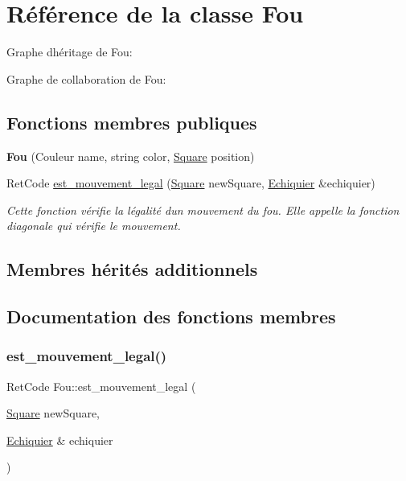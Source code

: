 \hypertarget{classFou}{}\section{Référence de la classe Fou}
\label{classFou}


Graphe d\textquotesingle{}héritage de Fou\+:


Graphe de collaboration de Fou\+:
\subsection*{Fonctions membres publiques}
\begin{DoxyCompactItemize}
\item 
\mbox{\label{classFou_a7c193c5725a7c543e6ee8fb78257370b}} 
{\bfseries Fou} (Couleur name, string color, \hyperlink{classSquare}{Square} position)
\item 
Ret\+Code \hyperlink{classFou_a5b1e65e01d3172846e0e28e8ac50c03d}{est\+\_\+mouvement\+\_\+legal} (\hyperlink{classSquare}{Square} new\+Square, \hyperlink{classEchiquier}{Echiquier} \&echiquier)
\begin{DoxyCompactList}\small\item\em Cette fonction vérifie la légalité d\textquotesingle{}un mouvement du fou. Elle appelle la fonction diagonale qui vérifie le mouvement. \end{DoxyCompactList}\end{DoxyCompactItemize}
\subsection*{Membres hérités additionnels}


\subsection{Documentation des fonctions membres}
\mbox{\label{classFou_a5b1e65e01d3172846e0e28e8ac50c03d}} 
\subsubsection{\texorpdfstring{est\+\_\+mouvement\+\_\+legal()}{est\_mouvement\_legal()}}
{\footnotesize\ttfamily Ret\+Code Fou\+::est\+\_\+mouvement\+\_\+legal (\begin{DoxyParamCaption}\item[{\hyperlink{classSquare}{Square}}]{new\+Square,  }\item[{\hyperlink{classEchiquier}{Echiquier} \&}]{echiquier }\end{DoxyParamCaption})\hspace{0.3cm}{\ttfamily [virtual]}}



